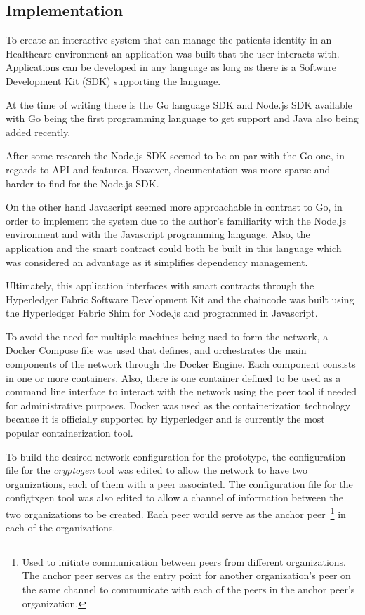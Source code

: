 \subsection{Implementation}

To create an interactive system that can manage the patients identity in an
Healthcare environment an application was built that the user interacts with.
Applications can be developed in any language as long as there is a Software
Development Kit (SDK) supporting the language. 

At the time of writing there is the Go language SDK and Node.js SDK available
with Go being the first programming language to get support and Java also being
added recently. 

After some research the Node.js SDK seemed to be on par with the Go one, in
regards to API and features. However, documentation was more sparse and harder
to find for the Node.js SDK. 

On the other hand Javascript seemed more approachable in contrast to Go, in
order to implement the system due to the author's familiarity with the Node.js
environment and with the Javascript programming language. Also, the application
and the smart contract could both be built in this language which was
considered an advantage as it simplifies dependency management. 

Ultimately, this application interfaces with smart contracts through the
Hyperledger Fabric Software Development Kit and the chaincode was built using
the Hyperledger Fabric Shim for Node.js and programmed in Javascript.

To avoid the need for multiple machines being used to form the network, a
Docker Compose file was used that defines, and orchestrates the main components
of the network through the Docker Engine. Each component consists in one or
more containers. Also, there is one  container defined to be used as a command
line interface to interact with the network using the peer tool if needed for
administrative purposes. Docker was used as the containerization technology
because it is officially supported by Hyperledger and is currently the most
popular containerization tool.

To build the desired network configuration for the prototype, the configuration
file for the \textit{cryptogen} tool was edited to allow the network to have
two organizations, each of them with a peer associated. The configuration file
for the configtxgen tool was also edited to allow a channel of information
between the two organizations to be created. Each peer would serve as the
anchor peer~\footnote{Used to initiate communication between peers from
different organizations. The anchor peer serves as the entry point for another
organization’s peer on the same channel to communicate with each of the peers
in the anchor peer’s organization.} in each of the organizations.

